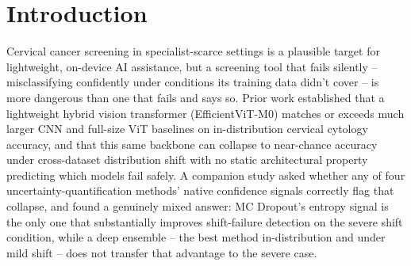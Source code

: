 \documentclass[runningheads]{llncs}
\begin{document}
\begin{abstract}
\end{abstract}

\section{Introduction}

Cervical cancer screening in specialist-scarce settings is a plausible
target for lightweight, on-device AI assistance, but a screening tool that
fails silently -- misclassifying confidently under conditions its
training data didn't cover -- is more dangerous than one that fails and
says so. Prior work established that a lightweight hybrid vision
transformer (EfficientViT-M0) matches or exceeds much larger CNN and
full-size ViT baselines on in-distribution cervical cytology accuracy, and
that this same backbone can collapse to near-chance accuracy under
cross-dataset distribution shift with no static architectural property
predicting which models fail safely. A companion study asked whether any
of four uncertainty-quantification methods' native confidence signals
correctly flag that collapse, and found a genuinely mixed answer: MC
Dropout's entropy signal is the only one that substantially improves
shift-failure detection on the severe shift condition, while a deep
ensemble -- the best method in-distribution and under mild shift -- does
not transfer that advantage to the severe case.
\end{document}
